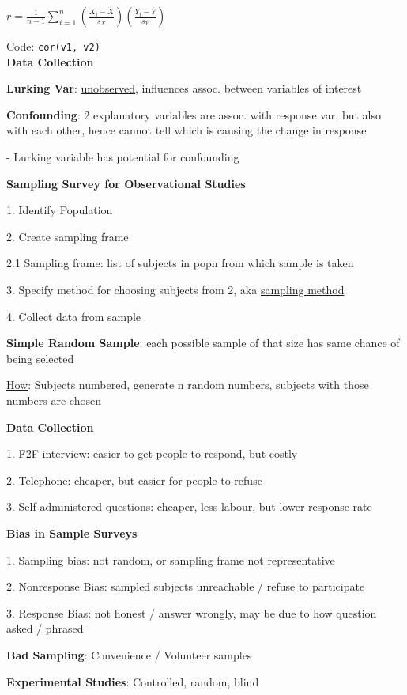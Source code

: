 \documentclass[10pt, a4paper]{article}
\newcommand{\header}[1]{{\normalsize\textbf{#1}}}
\newcommand{\tab}[0]{\hspace*{2mm}}
\begin{document}
\begin{multicols*}{3}
		\centerline{$r = \frac{1}{n - 1}\sum_{i = 1}^{n} (\frac{X_i - \overline{X}}{s_X})(\frac{Y_i - \overline{Y}}{s_Y})$}

		Code: \texttt{cor(v1, v2)}\\

		\header{Data Collection}

		\textbf{Lurking Var}: \underline{unobserved}, influences assoc. between variables of interest

		\textbf{Confounding}: 2 explanatory variables are assoc. with response var, but also with each other,
		hence cannot tell which is causing the change in response

		\tab{} - Lurking variable has potential for confounding

		\textbf{Sampling Survey for Observational Studies}

		1. Identify Population

		2. Create sampling frame

		\tab{} 2.1 Sampling frame: list of subjects in popn from which sample is taken

		3. Specify method for choosing subjects from 2, aka \underline{sampling method}

		4. Collect data from sample

		\textbf{Simple Random Sample}: each possible sample of that size has same chance of being selected

		\underline{How}: Subjects numbered, generate n random numbers, subjects with those numbers are chosen

		\textbf{Data Collection}

		1. F2F interview: easier to get people to respond, but costly

		2. Telephone: cheaper, but easier for people to refuse 

		3. Self-administered questions: cheaper, less labour, but lower response rate

		\textbf{Bias in Sample Surveys}

		1. Sampling bias: not random, or sampling frame not representative

		2. Nonresponse Bias: sampled subjects unreachable / refuse to participate

		3. Response Bias: not honest / answer wrongly, may be due to how question asked / phrased

		\textbf{Bad Sampling}: Convenience / Volunteer samples

		\textbf{Experimental Studies}: Controlled, random, blind


\end{multicols*}
\end{document}
